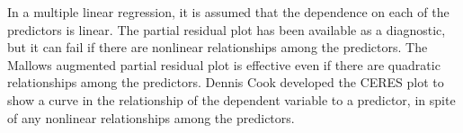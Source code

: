 \documentclass[residuals.tex]{subfiles}
\begin{document}
In a multiple linear regression, it is assumed that the dependence on each of the predictors is linear. The partial residual plot has been available as a diagnostic, but it can fail if there are nonlinear relationships among the predictors. The Mallows augmented partial residual plot is effective even if there are quadratic relationships among the predictors. Dennis Cook developed the CERES plot to show a curve in the relationship of the dependent variable to a predictor, in spite of any nonlinear relationships among the predictors.
\end{document}
